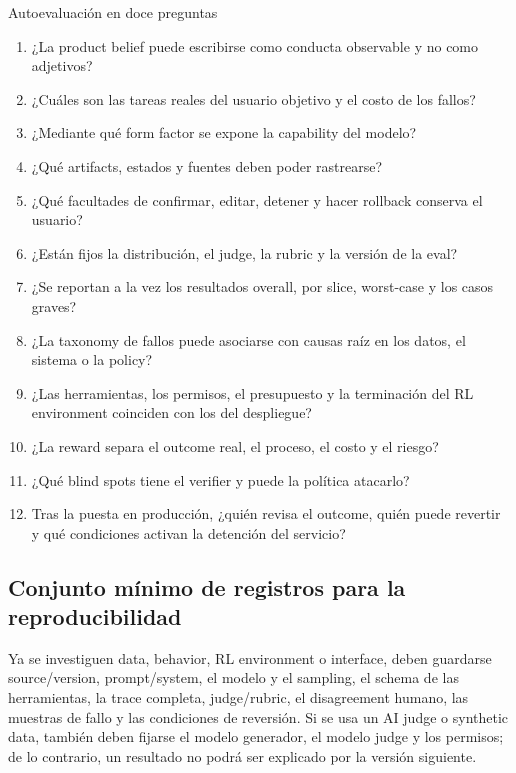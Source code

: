 \documentclass[a4paper]{article}
\begin{document}
\begin{importantbox}{Autoevaluación en doce preguntas}
\begin{enumerate}
  \item ¿La product belief puede escribirse como conducta observable y no como adjetivos?
  \item ¿Cuáles son las tareas reales del usuario objetivo y el costo de los fallos?
  \item ¿Mediante qué form factor se expone la capability del modelo?
  \item ¿Qué artifacts, estados y fuentes deben poder rastrearse?
  \item ¿Qué facultades de confirmar, editar, detener y hacer rollback conserva el usuario?
  \item ¿Están fijos la distribución, el judge, la rubric y la versión de la eval?
  \item ¿Se reportan a la vez los resultados overall, por slice, worst-case y los casos graves?
  \item ¿La taxonomy de fallos puede asociarse con causas raíz en los datos, el sistema o la policy?
  \item ¿Las herramientas, los permisos, el presupuesto y la terminación del RL environment coinciden con los del despliegue?
  \item ¿La reward separa el outcome real, el proceso, el costo y el riesgo?
  \item ¿Qué blind spots tiene el verifier y puede la política atacarlo?
  \item Tras la puesta en producción, ¿quién revisa el outcome, quién puede revertir y qué condiciones activan la detención del servicio?
\end{enumerate}
\end{importantbox}

\subsection{Conjunto mínimo de registros para la reproducibilidad}

Ya se investiguen data, behavior, RL environment o interface, deben guardarse source/version, prompt/system, el modelo y el sampling, el schema de las herramientas, la trace completa, judge/rubric, el disagreement humano, las muestras de fallo y las condiciones de reversión. Si se usa un AI judge o synthetic data, también deben fijarse el modelo generador, el modelo judge y los permisos; de lo contrario, un resultado no podrá ser explicado por la versión siguiente.
\end{document}
